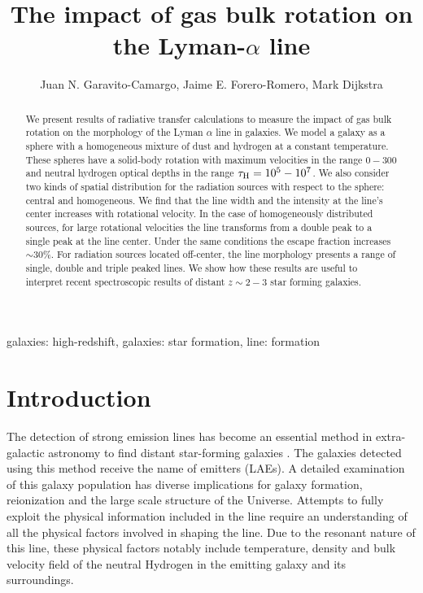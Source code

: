 \documentclass{emulateapj}
\newcommand{\ly}{{\ifmmode{{\rm Ly}\alpha~}\else{Ly$\alpha$~}\fi}}
\newcommand{\kms}{{\ifmmode{{\mathrm{\,km\ s}^{-1}}}\else{\,km~s$^{-1}$}\fi}}
\begin{document}
\title{The impact of gas bulk rotation on the Lyman-$\alpha$ line} 
\author{
  Juan N. Garavito-Camargo,
  Jaime E. Forero-Romero,
  Mark Dijkstra
}


\begin{abstract}
We present results of radiative transfer calculations to measure
the impact of gas bulk rotation on the morphology of the Lyman $\alpha$ line in galaxies. 
We model a galaxy as a sphere with a
homogeneous mixture of dust and hydrogen at a constant
temperature. These spheres have a solid-body rotation with
maximum velocities in the range $0-300$ \kms and neutral
hydrogen optical depths in the range $\tau_{\rm
H}=10^{5}-10^{7}$. We also consider two kinds of spatial
distribution for the radiation sources with respect to the sphere:
central and homogeneous. We find that the line width and the intensity
at the line's center increases with rotational velocity. In the case of homogeneously distributed
sources, for large rotational velocities the line transforms from a
double peak to a single peak at the line center. Under the same
conditions the escape fraction increases $\sim 30\%$. For
radiation sources located off-center, the line morphology presents a
range of single, double and triple peaked lines. We show how these results are
useful to interpret recent spectroscopic results of distant $z\sim 2-3$ star
forming galaxies.
\end{abstract}

\begin{keywords}
{galaxies: high-redshift, galaxies: star formation, line: formation}
\end{keywords}


\section{Introduction}
\label{sec:intro}

The detection of strong \ly emission lines has become an essential
method in extra-galactic astronomy to find distant star-forming
galaxies
\citep{PartridgePeebles,Rhoads00,Gawiser2007,Koehler2007,Ouchi08,Yamada2012,Schenker2012}.
The galaxies detected using this method receive the 
name of \ly emitters (LAEs). A detailed examination of this galaxy
population has diverse implications for galaxy formation, reionization
and the large scale structure of the Universe. Attempts to fully
exploit the physical information included in the \ly line require an
understanding of all the physical factors involved in shaping the
line. Due to the resonant nature of this line, these physical factors
notably include temperature, density and bulk velocity field of the neutral
Hydrogen in the emitting galaxy and its surroundings.
\end{document}
